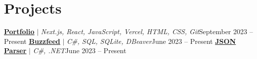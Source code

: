\section{Projects}
\resumeSubHeadingListStart
\resumeProjectHeading
{\textbf{\href{https://jaychen.app}{\underline{Portfolio}}} $|$ \emph{Next.js, React, JavaScript, Vercel, HTML, CSS, Git}}{September 2023 -- Present}
\resumeItemListStart
{}
\resumeItemListEnd
\resumeProjectHeading
{\textbf{\href{https://github.com/jundachen10/buzzfeed}{\underline{Buzzfeed}}} $|$ \emph{C\#, SQL, SQLite, DBeaver}}{June 2023 -- Present}
\resumeItemListStart
{}
\resumeItemListEnd
\resumeProjectHeading
{\textbf{\href{https://github.com/jundachen10/JSONParser}{\underline{JSON Parser}}} $|$ \emph{C\#, .NET}}{June 2023 -- Present}
\resumeItemListStart
{}
\resumeItemListEnd
\resumeSubHeadingListEnd